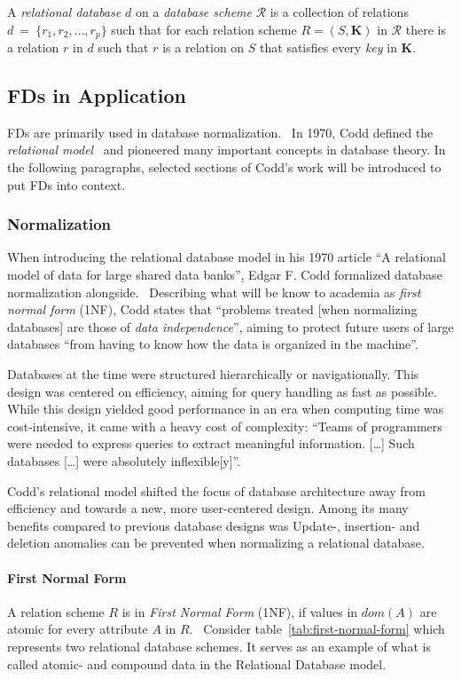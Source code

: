 A \emph{relational database} \( d \) on a \emph{database scheme} \( \mathcal{R} \) is a collection of relations \( d~=~\{r_1, r_2, \dots, r_p \} \) such that for each relation scheme \(R = (S, \boldsymbol{K}) \) in \( \mathcal{R} \) there is a relation \(r\) in \(d\) such that \(r\) is a relation on \(S\) that satisfies every \emph{key} in \(\boldsymbol{K}\).~\cite[p.~94]{MAI83}


\subsection{FDs in Application}
FDs are primarily used in database normalization.~\cite[p.~1]{CAR16}
In 1970, Codd defined the \emph{relational model}~\cite{COD70} and pioneered many important concepts in database theory.
In the following paragraphs, selected sections of Codd's work will be introduced to put FDs into context.

\subsubsection{Normalization}
When introducing the relational database model in his 1970 article ``A relational model of data for large shared data banks'', Edgar F. Codd formalized database normalization alongside.~\cite{COD70}
Describing what will be know to academia as \emph{first normal form} (1NF), Codd states that ``problems treated [when normalizing databases] are those of \emph{data independence}'', aiming to protect future users of large databases ``from having to know how the data is organized in the machine''.~\cite[p.~1]{COD70}

Databases at the time were structured hierarchically or navigationally.
This design was centered on efficiency, aiming for query handling as fast as possible.
While this design yielded good performance in an era when computing time was cost-intensive, it came with a heavy cost of complexity:
``Teams of programmers were needed to express queries to extract meaningful information. [\dots] Such databases [\dots] were absolutely inflexible[y]''.~\cite{IBM03}

Codd's relational model shifted the focus of database architecture away from efficiency and towards a new, more user-centered design.
Among its many benefits compared to previous database designs was
Update-, insertion- and deletion anomalies can be prevented when normalizing a relational database.~\cite[p.~75]{KLE11}

\paragraph{First Normal Form} A relation scheme $R$ is in \emph{First Normal Form} (1NF), if values in \(dom(A)\) are atomic for every attribute \(A\) in \(R\).~\cite[p.~96]{MAI83}
Consider table~\ref{tab:first-normal-form} which represents two relational database schemes.
It serves as an example of what is called atomic- and compound data in the Relational Database model.~\cite[p.~6]{COD90}

